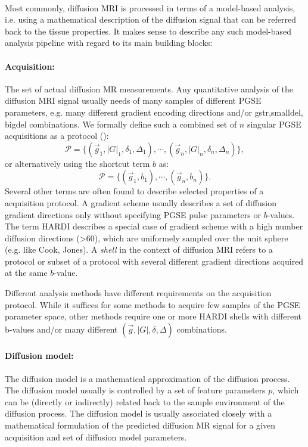 \paragraph{}
Most commonly, diffusion MRI is processed in terms of a model-based analysis, i.e. using a mathematical description of the diffusion signal that can be referred back to the tissue properties. It makes sense to describe any such model-based analysis pipeline with regard to its main building blocks: 

\paragraph{Acquisition:} The set of actual diffusion MR measurements. Any quantitative analysis of the diffusion MRI signal usually needs of many samples of different PGSE parameters, e.g. many different gradient encoding directions and/or \gls{gstr},\gls{smalldel}, \gls{bigdel} combinations. We formally define such a combined set of $n$ singular PGSE acquisitions as a protocol (\prot):
\begin{equation}
	\mathcal{P} = \{(\vec{g}_1,|G|_1,\delta_1,\Delta_1),\cdots,(\vec{g}_n,|G|_n,\delta_n,\Delta_n)\},
\end{equation}
or alternatively using the shortcut term $b$ as:
\begin{equation*}		
	\mathcal{P} = \{(\vec{g}_1,b_1),\cdots,(\vec{g}_n,b_n)\}.
\end{equation*}
Several other terms are often found to describe selected properties of a acquisition protocol. A gradient scheme usually describes a set of diffusion gradient directions only without specifying PGSE pulse parameters or $b$-values. The term \gls{HARDI} describes a special case of gradient scheme with a high number diffusion directions (>60), which are uniformely sampled over the unit sphere (e.g. like Cook, Jones). A \textit{shell} in the context of diffusion MRI refers to a protocol or subset of a protocol with several different gradient directions acquired at the same $b$-value. 



Different analysis methods have different requirements on the acquisition protocol. While it suffices for some methods to acquire few samples of the PGSE parameter space, other methods require one or more HARDI shells with different b-values and/or many different $(\vec{g},|G|,\delta,\Delta)$ combinations.  


\paragraph{Diffusion model:} The diffusion model is a mathematical approximation of the diffusion process. The diffusion model usually is controlled by a set of feature parameters $p$, which can be (directly or indirectly) related back to the sample environment of the diffusion process. The diffusion model is usually associated closely with a mathematical formulation of the predicted diffusion MR signal for a given acquisition and set of diffusion model parameters.

